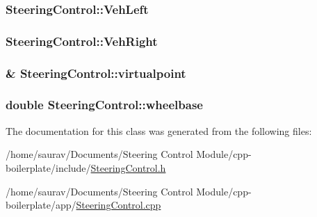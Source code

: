 \subsubsection[{\texorpdfstring{Veh\+Left}{VehLeft}}]{ Steering\+Control\+::\+Veh\+Left\hspace{0.3cm}{\ttfamily [private]}}\hypertarget{classSteeringControl_af444dd9970b9e9872d37c601a212d78a}{}\label{classSteeringControl_af444dd9970b9e9872d37c601a212d78a}
\subsubsection[{\texorpdfstring{Veh\+Right}{VehRight}}]{ Steering\+Control\+::\+Veh\+Right\hspace{0.3cm}{\ttfamily [private]}}\hypertarget{classSteeringControl_a991991a5e295b9c729749c709b84f3b2}{}\label{classSteeringControl_a991991a5e295b9c729749c709b84f3b2}
\subsubsection[{\texorpdfstring{virtualpoint}{virtualpoint}}]{\& Steering\+Control\+::virtualpoint\hspace{0.3cm}{\ttfamily [private]}}\hypertarget{classSteeringControl_ac3008c88d68138c338a4bd3ee32e46bd}{}\label{classSteeringControl_ac3008c88d68138c338a4bd3ee32e46bd}
\subsubsection[{\texorpdfstring{wheelbase}{wheelbase}}]{\setlength{\rightskip}{0pt plus 5cm}double Steering\+Control\+::wheelbase\hspace{0.3cm}{\ttfamily [private]}}\hypertarget{classSteeringControl_a7236de7b5f030e67047cdeaea3dbabb4}{}\label{classSteeringControl_a7236de7b5f030e67047cdeaea3dbabb4}


The documentation for this class was generated from the following files\+:\begin{DoxyCompactItemize}
\item 
/home/saurav/\+Documents/\+Steering Control Module/cpp-\/boilerplate/include/\hyperlink{SteeringControl_8h}{Steering\+Control.\+h}\item 
/home/saurav/\+Documents/\+Steering Control Module/cpp-\/boilerplate/app/\hyperlink{SteeringControl_8cpp}{Steering\+Control.\+cpp}\end{DoxyCompactItemize}
